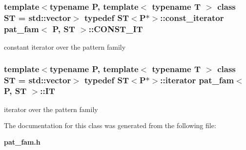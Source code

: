 \subsubsection{\setlength{\rightskip}{0pt plus 5cm}template$<$typename P, template$<$ typename T $>$ class ST = std::vector$>$ typedef ST$<$P$\ast$$>$::const\_\-iterator \bf{pat\_\-fam}$<$ P, ST $>$::\bf{CONST\_\-IT}}\label{classpat__fam_67dacba8345d6bc79cd6fc27dded687e}


constant iterator over the pattern family 
\subsubsection{\setlength{\rightskip}{0pt plus 5cm}template$<$typename P, template$<$ typename T $>$ class ST = std::vector$>$ typedef ST$<$P$\ast$$>$::iterator \bf{pat\_\-fam}$<$ P, ST $>$::\bf{IT}}\label{classpat__fam_f42739377391af385987f0316766b19a}


iterator over the pattern family 

The documentation for this class was generated from the following file:\begin{CompactItemize}
\item 
\bf{pat\_\-fam.h}\end{CompactItemize}
